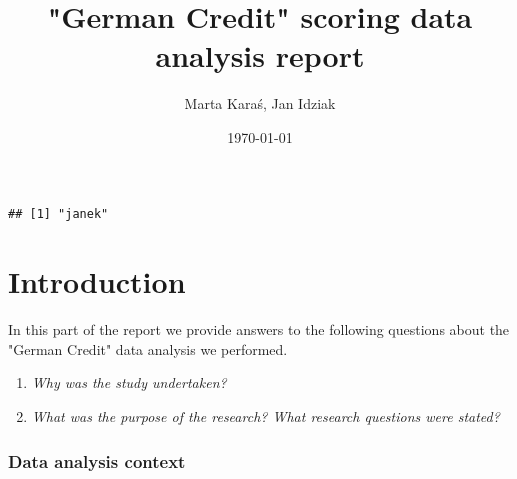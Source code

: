 \documentclass[10pt]{article}\usepackage[]{graphicx}\usepackage[]{color}
\makeatletter
\newenvironment{kframe}{%
 \def\at@end@of@kframe{}%
 \ifinner\ifhmode%
  \def\at@end@of@kframe{\end{minipage}}%
  \begin{minipage}{\columnwidth}%
 \fi\fi%
 \def\FrameCommand##1{\hskip\@totalleftmargin \hskip-\fboxsep
 \colorbox{shadecolor}{##1}\hskip-\fboxsep
     \hskip-\linewidth \hskip-\@totalleftmargin \hskip\columnwidth}%
 \MakeFramed {\advance\hsize-\width
   \@totalleftmargin\z@ \linewidth\hsize
   \@setminipage}}%
 {\par\unskip\endMakeFramed%
 \at@end@of@kframe}
\newenvironment{knitrout}{}{} %
\makeatother
\begin{document}
\title{"German Credit" scoring data analysis report}
\author{Marta Karaś, Jan Idziak}
\date{\today}
\maketitle


\newcommand{\E}{\mathbb{E}}
\newcommand{\Var}{\textnormal{Var}}
\newcommand{\bias}{\textnormal{bias}}
\newcommand{\mse}{\textnormal{MSE}}
\newcommand{\se}{\textnormal{se}}

\def\contentsname{Table of content}
\tableofcontents
\setcounter{tocdepth}{2}

\begin{knitrout}
\color{fgcolor}\begin{kframe}
\begin{verbatim}
## [1] "janek"
\end{verbatim}
\end{kframe}
\end{knitrout}


\clearpage
\part{Introduction}

In this part of the report we provide answers to the following questions about the "German Credit" data analysis we performed. 
\begin{enumerate}
\item \textit{Why was the study undertaken?}
\item \textit{What was the purpose of the research? What research questions were stated?} 
\end{enumerate}



\section{Data analysis context}
\end{document}
